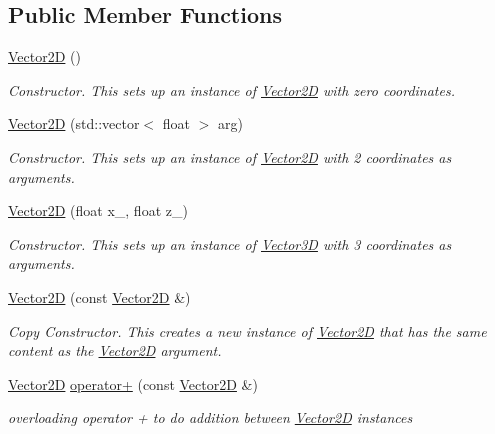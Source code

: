 \subsection*{Public Member Functions}
\begin{DoxyCompactItemize}
\item 
\mbox{\label{classcsci3081_1_1Vector2D_a4fad6fe37d4bc31a4aee9e2a5f32a1e8}} 
\hyperlink{classcsci3081_1_1Vector2D_a4fad6fe37d4bc31a4aee9e2a5f32a1e8}{Vector2D} ()
\begin{DoxyCompactList}\small\item\em Constructor. This sets up an instance of \hyperlink{classcsci3081_1_1Vector2D}{Vector2D} with zero coordinates. \end{DoxyCompactList}\item 
\hyperlink{classcsci3081_1_1Vector2D_a68e2f6906ba36747d914ef4923bee667}{Vector2D} (std\+::vector$<$ float $>$ arg)
\begin{DoxyCompactList}\small\item\em Constructor. This sets up an instance of \hyperlink{classcsci3081_1_1Vector2D}{Vector2D} with 2 coordinates as arguments. \end{DoxyCompactList}\item 
\hyperlink{classcsci3081_1_1Vector2D_a39919ae0bc8a91377c20d26f9201e963}{Vector2D} (float x\+\_\+, float z\+\_\+)
\begin{DoxyCompactList}\small\item\em Constructor. This sets up an instance of \hyperlink{classcsci3081_1_1Vector3D}{Vector3D} with 3 coordinates as arguments. \end{DoxyCompactList}\item 
\hyperlink{classcsci3081_1_1Vector2D_a7e70f495937c305fda255bcf0dfb85a8}{Vector2D} (const \hyperlink{classcsci3081_1_1Vector2D}{Vector2D} \&)
\begin{DoxyCompactList}\small\item\em Copy Constructor. This creates a new instance of \hyperlink{classcsci3081_1_1Vector2D}{Vector2D} that has the same content as the \hyperlink{classcsci3081_1_1Vector2D}{Vector2D} argument. \end{DoxyCompactList}\item 
\hyperlink{classcsci3081_1_1Vector2D}{Vector2D} \hyperlink{classcsci3081_1_1Vector2D_a7431773929a3d0c18ab926eae0e4bc28}{operator+} (const \hyperlink{classcsci3081_1_1Vector2D}{Vector2D} \&)
\begin{DoxyCompactList}\small\item\em overloading operator + to do addition between \hyperlink{classcsci3081_1_1Vector2D}{Vector2D} instances \end{DoxyCompactList}\item 

\end{DoxyCompactItemize}
